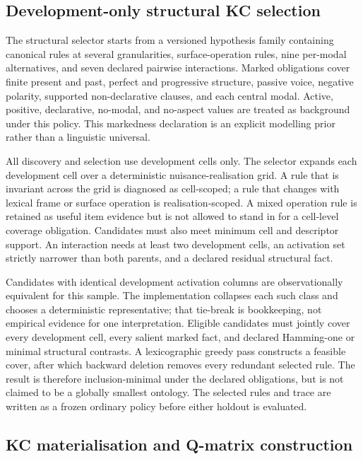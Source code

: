 \subsection{Development-only structural KC selection}
\label{sec:selection}

The structural selector starts from a versioned hypothesis family containing
canonical rules at several granularities, surface-operation rules, nine
per-modal alternatives, and seven declared pairwise interactions.  Marked
obligations cover finite present and past, perfect and progressive structure,
passive voice, negative polarity, supported non-declarative clauses, and each
central modal.  Active, positive, declarative, no-modal, and no-aspect values
are treated as background under this policy.  This markedness declaration is
an explicit modelling prior rather than a linguistic universal.

All discovery and selection use development cells only.  The selector expands
each development cell over a deterministic nuisance-realisation grid.  A rule
that is invariant across the grid is diagnosed as cell-scoped; a rule that
changes with lexical frame or surface operation is realisation-scoped.  A
mixed operation rule is retained as useful item evidence but is not allowed to
stand in for a cell-level coverage obligation.  Candidates must also meet
minimum cell and descriptor support.  An interaction needs at least two
development cells, an activation set strictly narrower than both parents, and
a declared residual structural fact.

Candidates with identical development activation columns are observationally
equivalent for this sample.  The implementation collapses each such class and
chooses a deterministic representative; that tie-break is bookkeeping, not
empirical evidence for one interpretation.  Eligible candidates must jointly
cover every development cell, every salient marked fact, and declared
Hamming-one or minimal structural contrasts.  A lexicographic greedy pass
constructs a feasible cover, after which backward deletion removes every
redundant selected rule.  The result is therefore inclusion-minimal under the
declared obligations, but is not claimed to be a globally smallest ontology.
The selected rules and trace are written as a frozen ordinary policy before
either holdout is evaluated.

\subsection{KC materialisation and Q-matrix construction}

